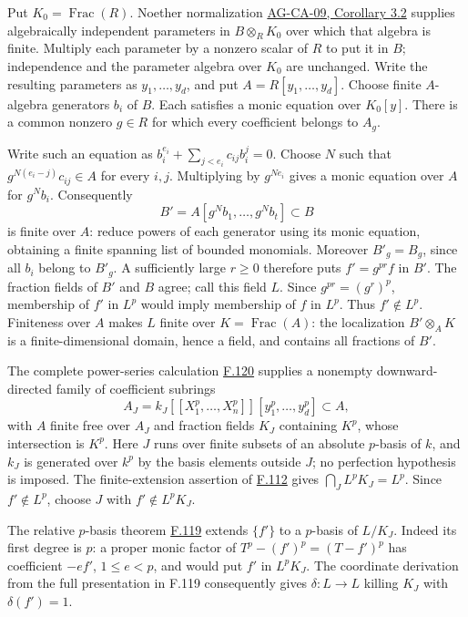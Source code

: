 \documentclass[11pt,a4paper,openany]{report}
\newcounter{none}
\begin{document}
Put \(K_0=\operatorname{Frac}(R)\). Noether normalization \href{https://github.com/KokunoYumeto/open-math-courses/blob/d02d0a3669f42579db037cd44de1d113fdd770a1/docs/courses/AG-CA/src/krull-dimension-and-noether-normalization.md}{AG-CA-09, Corollary 3.2} supplies algebraically independent parameters in \(B\otimes_RK_0\) over which that algebra is finite. Multiply each parameter by a nonzero scalar of \(R\) to put it in \(B\); independence and the parameter algebra over \(K_0\) are unchanged. Write the resulting parameters as \(y_1,\ldots,y_d\), and put \(A=R[y_1,\ldots,y_d]\). Choose finite \(A\)-algebra generators \(b_i\) of \(B\). Each satisfies a monic equation over \(K_0[y]\). There is a common nonzero \(g\in R\) for which every coefficient belongs to \(A_g\).

Write such an equation as \(b_i^{e_i}+\sum_{j<e_i}c_{ij}b_i^j=0\). Choose \(N\) such that \(g^{N(e_i-j)}c_{ij}\in A\) for every \(i,j\). Multiplying by \(g^{Ne_i}\) gives a monic equation over \(A\) for \(g^Nb_i\). Consequently \[B'=A[g^Nb_1,\ldots,g^Nb_t]\subset B\] is finite over \(A\): reduce powers of each generator using its monic equation, obtaining a finite spanning list of bounded monomials. Moreover \(B'_g=B_g\), since all \(b_i\) belong to \(B'_g\). A sufficiently large \(r\geq0\) therefore puts \(f'=g^{pr}f\) in \(B'\). The fraction fields of \(B'\) and \(B\) agree; call this field \(L\). Since \(g^{pr}=(g^r)^p\), membership of \(f'\) in \(L^p\) would imply membership of \(f\) in \(L^p\). Thus \(f'\notin L^p\). Finiteness over \(A\) makes \(L\) finite over \(K=\operatorname{Frac}(A)\): the localization \(B'\otimes_AK\) is a finite-dimensional domain, hence a field, and contains all fractions of \(B'\).

The complete power-series calculation \hyperref[AG-RG-S05-more-algebra-lemma-power-series-ring-subfields]{F.120} supplies a nonempty downward-directed family of coefficient subrings \[A_J=k_J[[X_1^p,\ldots,X_n^p]][y_1^p,\ldots,y_d^p]\subset A,\] with \(A\) finite free over \(A_J\) and fraction fields \(K_J\) containing \(K^p\), whose intersection is \(K^p\). Here \(J\) runs over finite subsets of an absolute \(p\)-basis of \(k\), and \(k_J\) is generated over \(k^p\) by the basis elements outside \(J\); no perfection hypothesis is imposed. The finite-extension assertion of \hyperref[AG-RG-S05-more-algebra-lemma-intersection-subfields]{F.112} gives \(\bigcap_JL^pK_J=L^p\). Since \(f'\notin L^p\), choose \(J\) with \(f'\notin L^pK_J\).

The relative \(p\)-basis theorem \hyperref[AG-RG-S05-more-algebra-lemma-p-basis]{F.119} extends \(\{f'\}\) to a \(p\)-basis of \(L/K_J\). Indeed its first degree is \(p\): a proper monic factor of \(T^p-(f')^p=(T-f')^p\) has coefficient \(-ef'\), \(1\leq e<p\), and would put \(f'\) in \(L^pK_J\). The coordinate derivation from the full presentation in F.119 consequently gives \(\delta:L\to L\) killing \(K_J\) with \(\delta(f')=1\).
\end{document}
